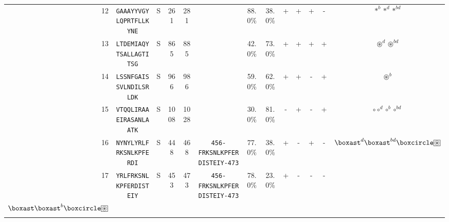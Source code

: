 \begin{tabular}{rcccccccccccc}
12 &  \texttt{GAAAYYVGYLQPRTFLLKYNE} &       S &    261 &   281 &                                                                  &                          88.0\% &                           38.0\% &          + &           + &          + &           - &                                                                                                                                 $ \ast^b \ast^d \ast^{bd} $ \\
13 &  \texttt{LTDEMIAQYTSALLAGTITSG} &       S &    865 &   885 &                                                                  &                          42.0\% &                           73.0\% &          + &           + &          + &           + &                                                                                                                          $ \circledast^d \circledast^{bd} $ \\
14 &  \texttt{LSSNFGAISSVLNDILSRLDK} &       S &    966 &   986 &                                                                  &                          59.0\% &                           62.0\% &          + &           + &          - &           + &                                                                                                                                           $ \circledast^b $ \\
15 &  \texttt{VTQQLIRAAEIRASANLAATK} &       S &   1008 &  1028 &                                                                  &                          30.0\% &                           81.0\% &          - &           + &          - &           + &                                                                                                                        $ \circ \circ^d \circ^b \circ^{bd} $ \\
16 &  \texttt{NYNYLYRLFRKSNLKPFERDI} &       S &    448 &   468 &  \texttt{{\scriptsize 456-}FRKSNLKPFERDISTEIY{\scriptsize -473}} &                          77.0\% &                           38.0\% &          + &           - &          + &           - &                                                                       $ \boxast^d \boxast^{bd} \boxcircle \setlength{\fboxsep}{0.5pt} \boxed{\circledast} $ \\
17 &  \texttt{YRLFRKSNLKPFERDISTEIY} &       S &    453 &   473 &  \texttt{{\scriptsize 456-}FRKSNLKPFERDISTEIY{\scriptsize -473}} &                          78.0\% &                           23.0\% &          + &           - &          - &           - &  \Centerstack{  $\boxempty \boxempty^b \boxempty^d \boxempty^{bd}$ \\  $\boxast \boxast^b \boxcircle \setlength{\fboxsep}{0.5pt} \boxed{\circledast}$ \\  } \\

\end{tabular}
